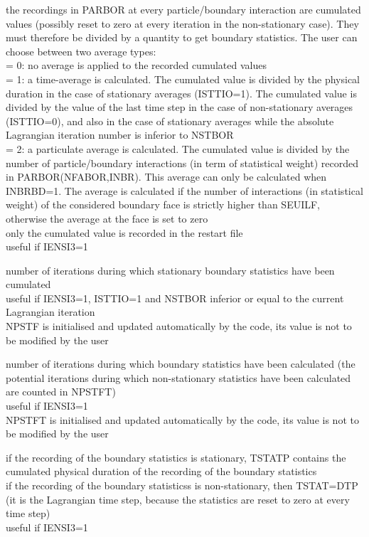 {the recordings in PARBOR at every particle/boundary interaction are
cumulated values (possibly reset to zero at every iteration in the
non-stationary case). They must therefore be divided by a quantity to
get boundary statistics. The user can choose between two average types:\\
\hspace*{1.3cm} = 0: no average is applied to the recorded cumulated values\\
\hspace*{1.3cm} = 1: a time-average is calculated. The cumulated value
is divided by the physical duration in the case of stationary
averages (ISTTIO=1). The cumulated value is divided by the value of
the last time step in the case of non-stationary averages (ISTTIO=0),
and also in the case of stationary averages while the
absolute Lagrangian iteration number is inferior to NSTBOR\\
\hspace*{1.3cm} = 2: a particulate average is calculated. The cumulated
value is divided by the number of particle/boundary interactions (in term of
statistical weight) recorded in PARBOR(NFABOR,INBR). This average can only
be calculated when INBRBD=1. The average is calculated if the number
of interactions (in statistical weight) of the considered boundary face
is strictly higher than SEUILF, otherwise the average at the face is set
to zero\\
only the cumulated value is recorded in the restart file\\
useful if IENSI3=1}

{number of iterations during which stationary boundary statistics have
been cumulated\\ 
useful if IENSI3=1, ISTTIO=1 and NSTBOR inferior or equal to the
current Lagrangian iteration\\
NPSTF is initialised and updated automatically by the code, its value is not to
be modified by the user}

{number of iterations during which boundary statistics have
been calculated
(the potential iterations during which non-stationary
statistics have been calculated are counted in NPSTFT)\\
useful if IENSI3=1\\
NPSTFT is initialised and updated automatically by the code, its value is not to
be modified by the user}

{if the recording of the boundary statistics is stationary, TSTATP contains
the cumulated physical duration of the recording of the boundary statistics\\
if the recording of the boundary statisticss is non-stationary, then
TSTAT=DTP (it is the Lagrangian time step, because the
statistics are reset to zero at every time step)\\
useful if IENSI3=1}
